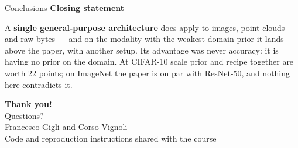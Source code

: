 \documentclass[aspectratio=169,11pt]{beamer}
\newcommand{\greenhead}[1]{{\color{AccentGreen}\bfseries #1}\par\vspace{0.25em}}
\begin{document}
\begin{frame}[shrink=21]{Conclusions}
  \vspace{0.5em}
  \greenhead{Closing statement}
    A \textbf{single general-purpose architecture} does apply to images, point clouds and raw bytes --- and on the modality with the weakest domain prior it lands above the paper, with another setup. Its advantage was never accuracy: it is \alert{having no prior on the domain}. At CIFAR-10 scale prior and recipe together are worth 22 points; on ImageNet the paper is on par with ResNet-50, and nothing here contradicts it.
  
\end{frame}



\begin{frame}
  \begin{center}
    {\Huge\color{UnifiBlue}\textbf{Thank you!}}\\[1.5em]
    {\Large\color{UnifiDark} Questions?}\\[2.5em]
    {\color{UnifiDark}Francesco Gigli and Corso Vignoli}\\[0.3em]
    {\small\color{UnifiDark} Code and reproduction instructions shared with the course}
  \end{center}
\end{frame}
\end{document}
